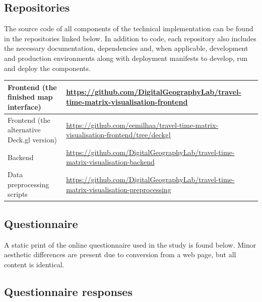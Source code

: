 \begin{appendices}
\makeatletter
\renewcommand{\thesubsection}{\@arabic\c@subsection}  %
\makeatother

\subsection{Repositories}
\label{appendix:repositories}

The source code of all components of the technical implementation
can be found in the repositories linked below.
In addition to code, each repository also includes
the necessary documentation,
dependencies and, when applicable,
development and production environments along with deployment manifests
to develop, run and deploy the components.

\begin{table}[H]
	\centering
	\begin{tabular}{ | L{0.38\textwidth} | L{0.62\textwidth} | }
		\hline
		Frontend (the finished map interface)
		& \url{https://github.com/DigitalGeographyLab/travel-time-matrix-visualisation-frontend}
		\\
		\hline
		Frontend (the alternative Deck.gl version)
		& \url{https://github.com/eemilhaa/travel-time-matrix-visualisation-frontend/tree/deckgl}
		\\
		\hline
		Backend
		& \url{https://github.com/DigitalGeographyLab/travel-time-matrix-visualisation-backend}
		\\
		\hline
		Data preprocessing scripts
		& \url{https://github.com/DigitalGeographyLab/travel-time-matrix-visualisation-preprocessing}
		\\
		\hline
	\end{tabular}
\end{table}


\subsection{Questionnaire}
\label{appendix:questionnaire}

A static print of the online questionnaire used in the study is found below.
Minor aesthetic differences are present due to conversion from a web page,
but all content is identical.



\subsection{Questionnaire responses}
\label{appendix:questionnaire responses}


\end{appendices}
